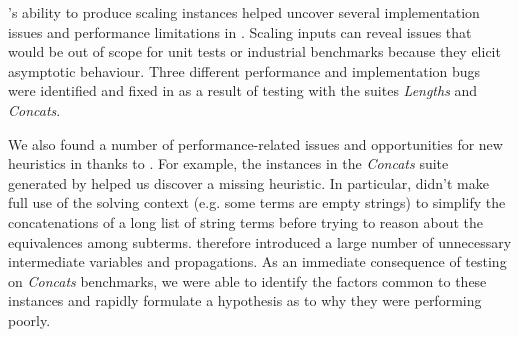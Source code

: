 \fuzzer{}'s ability to produce scaling instances helped uncover several
implementation issues and performance limitations in \us{}. Scaling inputs
can reveal issues that would be out of scope for unit tests or
industrial benchmarks because they elicit asymptotic behaviour. Three different
performance and implementation bugs were identified and fixed in \us{}
as a result of testing with the \fuzzer{} suites
\textit{Lengths} and \textit{Concats}.

We also found a number of performance-related issues and opportunities for
new heuristics in \us{} thanks to \fuzzer{}. For example, the
instances in the \textit{Concats} suite generated by \fuzzer{}
helped us discover a missing heuristic. In particular, \us{} didn't
make full use of the solving context (e.g. some terms are empty
strings) to simplify the concatenations of a long list of string terms
before trying to reason about the equivalences among subterms. \us{}
therefore introduced a large number of unnecessary intermediate
variables and propagations. As an immediate consequence of
testing \us{} on \textit{Concats} benchmarks, we were able to
identify the factors common to these instances and rapidly formulate a
hypothesis as to why they were performing poorly.
